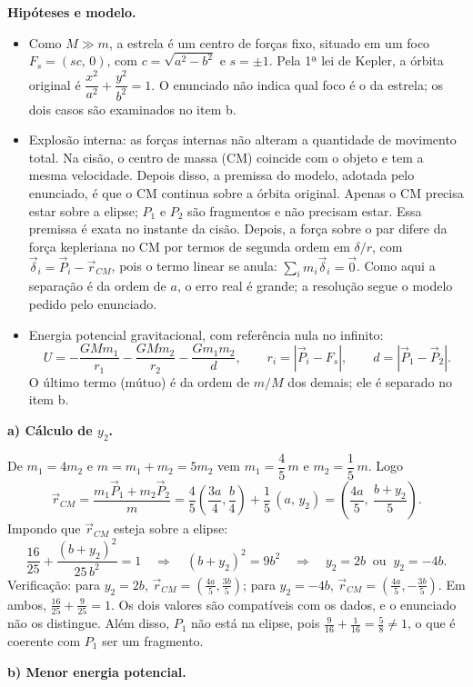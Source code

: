 \documentclass{article}%
\begin{document}
\textbf{Hipóteses e modelo.}
\begin{itemize}
\item Como $M\gg m$, a estrela é um centro de forças fixo, situado em um foco $F_s=(sc,\,0)$, com $c=\sqrt{a^2-b^2}$ e $s=\pm 1$. Pela 1ª lei de Kepler, a órbita original é $\dfrac{x^2}{a^2}+\dfrac{y^2}{b^2}=1$. O enunciado não indica qual foco é o da estrela; os dois casos são examinados no item b.
\item Explosão interna: as forças internas não alteram a quantidade de movimento total. Na cisão, o centro de massa (CM) coincide com o objeto e tem a mesma velocidade. Depois disso, a premissa do modelo, adotada pelo enunciado, é que o CM continua sobre a órbita original. Apenas o CM precisa estar sobre a elipse; $P_1$ e $P_2$ são fragmentos e não precisam estar. Essa premissa é exata no instante da cisão. Depois, a força sobre o par difere da força kepleriana no CM por termos de segunda ordem em $\delta/r$, com $\vec\delta_i=\vec P_i-\vec r_{CM}$, pois o termo linear se anula: $\sum_i m_i\vec\delta_i=\vec 0$. Como aqui a separação é da ordem de $a$, o erro real é grande; a resolução segue o modelo pedido pelo enunciado.
\item Energia potencial gravitacional, com referência nula no infinito:
\[ U=-\frac{GMm_1}{r_1}-\frac{GMm_2}{r_2}-\frac{Gm_1m_2}{d},\qquad r_i=|\vec P_i-F_s|,\qquad d=|\vec P_1-\vec P_2|. \]
O último termo (mútuo) é da ordem de $m/M$ dos demais; ele é separado no item b.
\end{itemize}

\textbf{a) Cálculo de $y_2$.}

De $m_1=4m_2$ e $m=m_1+m_2=5m_2$ vem $m_1=\dfrac45\,m$ e $m_2=\dfrac15\,m$. Logo
\[ \vec r_{CM}=\frac{m_1\vec P_1+m_2\vec P_2}{m}=\frac45\left(\frac{3a}{4},\frac b4\right)+\frac15\,(a,\,y_2)=\left(\frac{4a}{5},\ \frac{b+y_2}{5}\right). \]
Impondo que $\vec r_{CM}$ esteja sobre a elipse:
\[ \frac{16}{25}+\frac{(b+y_2)^2}{25\,b^2}=1 \quad\Longrightarrow\quad (b+y_2)^2=9b^2 \quad\Longrightarrow\quad y_2=2b \ \text{ ou } \ y_2=-4b. \]
Verificação: para $y_2=2b$, $\vec r_{CM}=\left(\frac{4a}{5},\frac{3b}{5}\right)$; para $y_2=-4b$, $\vec r_{CM}=\left(\frac{4a}{5},-\frac{3b}{5}\right)$. Em ambos, $\frac{16}{25}+\frac{9}{25}=1$. Os dois valores são compatíveis com os dados, e o enunciado não os distingue. Além disso, $P_1$ não está na elipse, pois $\frac{9}{16}+\frac{1}{16}=\frac58\neq 1$, o que é coerente com $P_1$ ser um fragmento.

\textbf{b) Menor energia potencial.}
\end{document}
